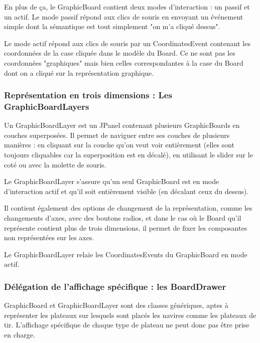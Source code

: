 	En plus de ça, le GraphicBoard contient deux modes d'interaction : un passif et un actif.
Le mode passif répond aux clics de souris en envoyant un événement simple dont la sémantique est tout simplement "on m'a cliqué dessus". \newline

	Le mode actif répond aux clics de souris par un CoordinatesEvent contenant les coordonnées de la case cliquée dans le modèle du Board. Ce ne sont pas les coordonnées "graphiques" mais bien celles correspondantes à la case du Board dont on a cliqué sur la représentation graphique.

\subsubsection{Représentation en trois dimensions : Les GraphicBoardLayers}
	Un GraphicBoardLayer est un JPanel contenant plusieurs GraphicBoards en couches superposées.
Il permet de naviguer entre ses couches de plusieurs manières : en cliquant sur la couche qu'on veut voir entièrement (elles sont toujours cliquables car la superposition est en décalé), en utilisant le slider sur le coté ou avec la molette de souris.
\newline

	Le GraphicBoardLayer s'assure qu'un seul GraphicBoard est en mode d'interaction actif et qu'il soit entièrement visible (en décalant ceux du dessus).
	\newline
	
	Il contient également des options de changement de la représentation, comme les changements d'axes, avec des boutons radios, et dans le cas où le Board qu'il représente contient plus de trois dimensions, il permet de fixer les composantes non représentées sur les axes.
\newline

Le GraphicBoardLayer relaie les CoordinatesEvents du GraphicBoard en mode actif.

\subsubsection{Délégation de l'affichage spécifique : les BoardDrawer}

	GraphicBoard et GraphicBoardLayer sont des classes génériques, aptes à représenter les plateaux sur lesquels sont placés les navires comme les plateaux de tir. L'affichage spécifique de chaque type de plateau ne peut donc pas être prise en charge.\newline
	
